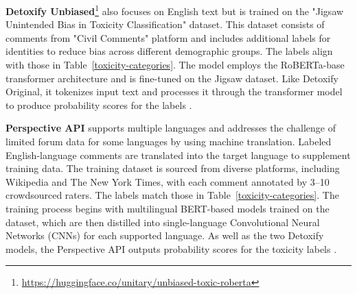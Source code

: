
\textbf{Detoxify Unbiased}\footnote{\url{https://huggingface.co/unitary/unbiased-toxic-roberta}} also focuses on English text but is trained on the "Jigsaw Unintended Bias in Toxicity Classification" dataset. This dataset consists of comments from "Civil Comments" platform and includes additional labels for identities to reduce bias across different demographic groups. The labels align with those in Table~\ref{toxicity-categories}. The model employs the RoBERTa-base transformer architecture and is fine-tuned on the Jigsaw dataset. Like Detoxify Original, it tokenizes input text and processes it through the transformer model to produce probability scores for the labels \cite{detoxify:medium}.


\textbf{Perspective API} supports multiple languages and addresses the challenge of limited forum data for some languages by using machine translation. Labeled English-language comments are translated into the target language to supplement training data. The training dataset is sourced from diverse platforms, including Wikipedia and The New York Times, with each comment annotated by 3--10 crowdsourced raters. The labels match those in Table~\ref{toxicity-categories}. The training process begins with multilingual BERT-based models trained on the dataset, which are then distilled into single-language Convolutional Neural Networks (CNNs) for each supported language. As well as the two Detoxify models, the Perspective API outputs probability scores for the toxicity labels \cite{lees:2022}.

